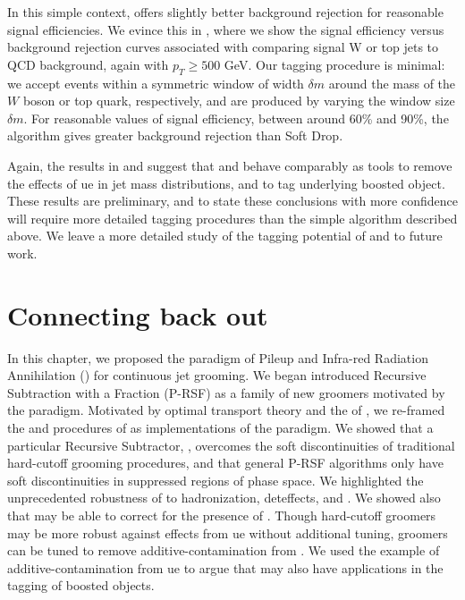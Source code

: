    In this simple context,  offers slightly better background rejection for reasonable signal efficiencies.
   We evince this in , where we show the signal efficiency versus background rejection curves associated with comparing signal W or top jets to QCD background, again with \(p_T \geq 500\) GeV.
   Our tagging procedure is minimal:
   we accept events within a symmetric window of width \(\delta m\) around the mass of the \(W\) boson or top quark, respectively, and  are produced by varying the window size \(\delta m\).
   For reasonable values of signal efficiency, between around 60\% and 90\%, the  algorithm gives greater background rejection than Soft Drop.

   Again, the results in  and  suggest that  and  behave comparably as tools to remove the effects of \gls{ue} in jet mass distributions, and to tag underlying boosted object.
   These results are preliminary, and to state these conclusions with more confidence will require more detailed tagging procedures than the simple algorithm described above.
   We leave a more detailed study of the tagging potential of  and \PIRANHA{} to future work.


\section{Connecting back out}
In this chapter, we proposed the paradigm of Pileup and Infra-red Radiation Annihilation (\PIRANHA{}) for continuous jet grooming.
%
%
We began introduced Recursive Subtraction with a Fraction (P-RSF) as a family of new groomers motivated by the \PIRANHA{} paradigm.
%
%
Motivated by optimal transport theory and the  of , we re-framed the  and  procedures of  as implementations of the \PIRANHA{} paradigm.
%
We showed that a particular Recursive Subtractor, , overcomes the soft discontinuities of traditional hard-cutoff grooming procedures, and that general P-RSF algorithms only have soft discontinuities in suppressed regions of phase space.
%
We highlighted the unprecedented robustness of  to \gls{hadronization}, \gls{deteffects}, and .
%
We showed also that  may be able to correct for the presence of .
%
Though hard-cutoff groomers may be more robust against effects from \gls{ue} without additional tuning, \PIRANHA{} groomers can be tuned to remove \gls{additive-contamination} from .
%
We used the example of \gls{additive-contamination} from \gls{ue} to argue that \PIRANHA{} may also have applications in the tagging of boosted objects.

